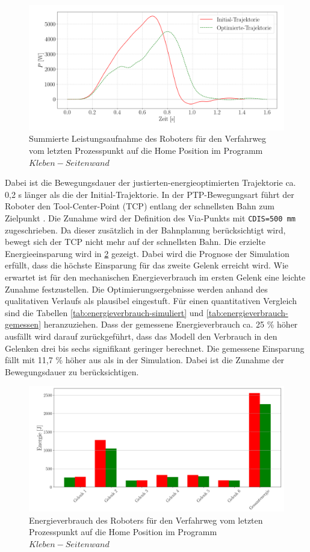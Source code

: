 %
\begin{figure}[tbph]
	\centering
	\includegraphics[width=1\linewidth]{images/P_up}
	\caption{Summierte Leistungsaufnahme des Roboters für den Verfahrweg vom letzten Prozesspunkt auf die  Home Position im Programm $Kleben-Seitenwand$}
	\label{fig:pup}
\end{figure}
%
Dabei ist die Bewegungsdauer der justierten-energieoptimierten Trajektorie ca. 0,2 s länger als die der Initial-Trajektorie. In der PTP-Bewegungsart führt der Roboter den Tool-Center-Point (TCP) entlang der schnellsten Bahn zum Zielpunkt \cite[S.~429]{KSS.2023}. Die Zunahme wird der Definition des Via-Punkts mit \lstinline{CDIS=500 mm}
zugeschrieben. Da dieser zusätzlich in der Bahnplanung berücksichtigt wird, bewegt sich der TCP nicht mehr auf der schnellsten Bahn. Die erzielte Energieeinsparung wird in \ref{fig:eup500} gezeigt. Dabei wird die Prognose der Simulation erfüllt, dass die höchste Einsparung für das zweite Gelenk erreicht wird. Wie erwartet ist für den mechanischen Energieverbrauch im ersten Gelenk eine leichte Zunahme festzustellen.  Die Optimierungsergebnisse werden anhand des qualitativen Verlaufs als plausibel eingestuft. Für einen quantitativen Vergleich sind die Tabellen \ref{tab:energieverbrauch-simuliert} und \ref{tab:energieverbrauch-gemessen} heranzuziehen. Dass der gemessene Energieverbrauch ca. 25 \% höher ausfällt wird darauf zurückgeführt, dass das Modell den Verbrauch in den Gelenken drei bis sechs signifikant geringer berechnet. Die gemessene Einsparung fällt mit 11,7 \% höher aus als in der Simulation. Dabei ist die Zunahme der Bewegungsdauer zu berücksichtigen. 
%
\begin{figure}[tbph]
	\centering
	\includegraphics[width=1\linewidth]{images/e_up500}
	\caption{Energieverbrauch des Roboters für den Verfahrweg vom letzten Prozesspunkt auf die  Home Position im Programm $Kleben-Seitenwand$}
	\label{fig:eup500}        
\end{figure}
